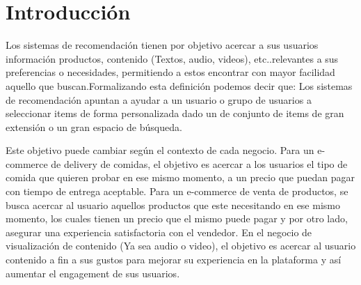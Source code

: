 \documentclass[11pt,a4paper,twoside]{thesis}
\begin{document}

\def\autor{Adrian Norberto Marino}
\def\tituloTesis{Sistemas de recomendación colaborativos e híbridos}
\def\runtitulo{Resumen}
\def\runtitle{Sistemas de recomendación colaborativos e híbridos}
\def\lugar{Buenos Aires, 2022}

%
\frontmatter
\pagestyle{empty}





\tableofcontents

\mainmatter
\pagestyle{headings}


\chapter{Introducción}

Los sistemas de recomendación tienen por objetivo acercar a sus usuarios información productos, contenido (Textos,  audio, videos), etc..relevantes a sus preferencias o necesidades, permitiendo a estos encontrar con mayor facilidad aquello que buscan.Formalizando esta definición podemos decir que:  Los sistemas de recomendación apuntan a ayudar a un usuario o grupo de usuarios a seleccionar items de forma personalizada dado un de conjunto de items de gran extensión o un gran espacio de búsqueda.

Este objetivo puede cambiar según el contexto de cada negocio. Para un e-commerce de delivery de comidas, el objetivo es acercar a los usuarios el tipo de comida que quieren probar en ese mismo momento, a un precio que puedan pagar con tiempo de entrega aceptable. Para un e-commerce de venta de productos, se busca acercar al usuario aquellos productos que este necesitando en ese mismo momento, los cuales tienen un precio que el mismo puede pagar y por otro lado, asegurar una experiencia satisfactoria con el vendedor. En el negocio de visualización de contenido (Ya sea audio o video), el objetivo es acercar al usuario contenido a fin a sus gustos para mejorar su experiencia en la plataforma y así aumentar el engagement de sus usuarios.
\end{document}
